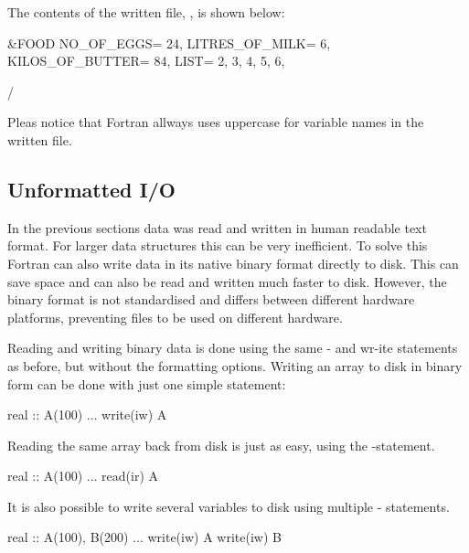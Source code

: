 The contents of the written file, , is shown below:

\cmdmode

\begin{fortrancodeenv}
&FOOD
 NO_OF_EGGS=         24,
 LITRES_OF_MILK=          6,
 KILOS_OF_BUTTER=         84,
 LIST=          2,          3,          4,          5,          6,
 
 /
\end{fortrancodeenv}

Pleas notice that Fortran allways uses uppercase for variable names in the written file.

%

\subsection{Unformatted I/O}

In the previous sections data was read and written in human readable text format. For larger data structures this can be very inefficient. To solve this Fortran can also write data in its native binary format directly to disk. This can save space and can also be read and written much faster to disk. However, the binary format is not standardised and differs between different hardware platforms, preventing files to be used on different hardware. 

Reading and writing binary data is done using the same - and wr-ite statements as before, but without the formatting options. Writing an array to disk in binary form can be done with just one simple statement:

\fmode

\begin{fortrancodeenv}
real :: A(100)
...
write(iw) A
\end{fortrancodeenv}

Reading the same array back from disk is just as easy, using the -statement.

\begin{fortrancodeenv}
real :: A(100)
...
read(ir) A
\end{fortrancodeenv}

It is also possible to write several variables to disk using multiple - statements.

\begin{fortrancodeenv}
real :: A(100), B(200)
...
write(iw) A
write(iw) B
\end{fortrancodeenv}

